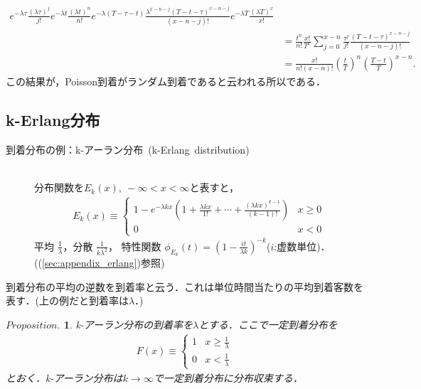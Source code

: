 \documentclass[a4j,papersize,disablejfam,slide,14pt]{jsarticle}
\newtheorem{Prop}{$Proposition.$}
\def\exp#1{e^{#1}} %
\begin{document}
\begin{description}
\begin{align}
{                	\exp{-\lambda \tau} \frac{(\lambda \tau)^j}{j!} 
                    \exp{-\lambda t} \frac{(\lambda t)^n}{n!} 
                    \exp{-\lambda (T - \tau - t)} \frac{\lambda^{x-n-j} (T - t - \tau)^{x-n-j}}{(x-n-j)!}}{\exp{-\lambda T} \frac{(\lambda T)^x}{x!}} \\
                &= \frac{t^n}{n!} \frac{x!}{T^x} \sum_{j=0}^{x-n} \frac{\tau^j}{j!} \frac{(T - t - \tau)^{x-n-j}}{(x-n-j)!} \\
                &= \frac{x!}{n!(x-n)!} \left( \frac{t}{T} \right)^n \left( \frac{T-t}{T} \right)^{x-n}.
            \end{align}
            この結果が，{\rm Poisson}到着がランダム到着であると云われる所以である．
    \end{description}
    
\subsection{{\rm k-Erlang}分布}
	\begin{description}
    	\item[到着分布の例：{\rm k-}アーラン分布\ {\rm (k-Erlang\ distribution)}]\mbox{}\\
    		分布関数を$E_k(x),\ -\infty < x < \infty$と表すと，
    		\begin{align}
    			E_k(x) \equiv
        		\begin{cases}
        			1 - \exp{-\lambda k x} \left( 1 + \frac{\lambda k x}{1!} + \cdots + \frac{(\lambda k x)^{k-1}}{(k-1)!} \right) & \text{$x \geq 0$}\\
    				0 & \text{$x < 0$}
        		\end{cases}
    		\end{align}
            平均 $\frac{1}{\lambda}$，分散 $\frac{1}{k\lambda^2}$，
            特性関数 $\phi_{E_k}(t) = \left( 1 - \frac{it}{\lambda k} \right)^{-k}$($i$:虚数単位)．((\ref{sec:appendix_erlang})参照)
    \end{description}
    到着分布の平均の逆数を到着率と云う．これは単位時間当たりの平均到着客数を表す．(上の例だと到着率は$\lambda$．) \\
	\begin{screen}
    	\begin{Prop}
        	{\rm k-}アーラン分布の到着率を$\lambda$とする．ここで一定到着分布を
            \begin{align}
            	F(x) \equiv
                \begin{cases}
                	1 & \text{$x \geq \frac{1}{\lambda}$}\\
                    0 & \text{$x < \frac{1}{\lambda}$}
                \end{cases}
            \end{align}
            とおく．{\rm k-}アーラン分布は$k \rightarrow \infty$で一定到着分布に分布収束する．
        \end{Prop}
    \end{screen}
\end{document}
